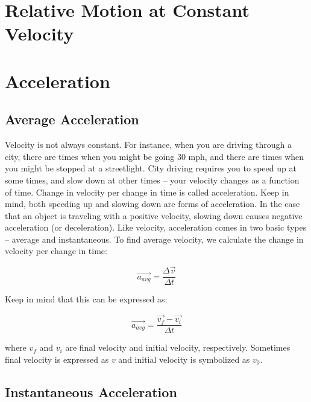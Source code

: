 	
	
	
	

\section{Relative Motion at Constant Velocity}


\section{Acceleration}
\subsection{Average Acceleration} 
Velocity is not always constant.  For instance, when you are driving through a city, there are times when you might be going 30 mph, and there are times when you might be stopped at a streetlight.  City driving requires you to speed up at some times, and slow down at other times – your velocity changes as a function of time.  Change in velocity per change in time is called acceleration.  
Keep in mind, both speeding up and slowing down are forms of acceleration.  In the case that an object is traveling with a positive velocity, slowing down causes negative acceleration (or deceleration).
Like velocity, acceleration comes in two basic types – average and instantaneous.  To find average velocity, we calculate the change in velocity per change in time:

\begin{mdframed}[backgroundcolor=orange!20!white]
	\begin{equation}
	\overrightarrow{a_{avg}} = \frac{\Delta \vec{v}}{\Delta t} 
	\label{equation:averageacceleration}
	\end{equation}
\end{mdframed}	
Keep in mind that this can be expressed as:
\begin{mdframed}[backgroundcolor=orange!20!white]
	\begin{equation}
	\overrightarrow{a_{avg}} = \frac{\overrightarrow{v_f} - \overrightarrow {v_i}}{\Delta t}
	\label{equation:averageaccelerationalt}
	\end{equation}
\end{mdframed}	


where $v_f$ and $v_i$ are final velocity and initial velocity, respectively.  Sometimes final velocity is expressed as $v$ and initial velocity is symbolized as $v_0$. 

\subsection{Instantaneous Acceleration} 

